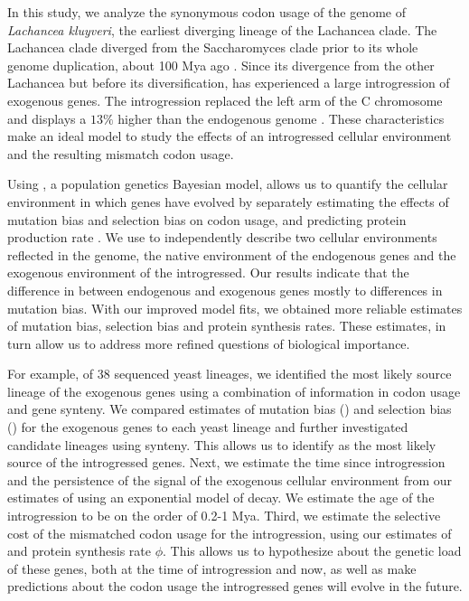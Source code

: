 In this study, we analyze the synonymous codon usage of the genome of \textit{Lachancea kluyveri}, the earliest diverging lineage of the Lachancea clade.
The Lachancea clade diverged from the Saccharomyces clade prior to its whole genome duplication, about 100 Mya ago \citep{MHM2015,Beimforde2014}.
Since its divergence from the other Lachancea but before its diversification, \kluyveri has experienced a large introgression of exogenous genes.
The introgression replaced the left arm of the C chromosome and displays a $13 \%$ higher \GC than the endogenous \kluyveri genome \citep{payen2009, friedrich2015}.
These characteristics make \kluyveri an ideal model to study the effects of an introgressed cellular environment and the resulting mismatch codon usage.

Using \ROC, a population genetics Bayesian model, allows us to quantify the cellular environment in which genes have evolved by separately estimating the effects of mutation bias and selection bias on codon usage, and predicting protein production rate \citep{gilchrist2015}.
We use \ROC to independently describe two cellular environments reflected in the \kluyveri genome, the native environment of the endogenous genes and the exogenous environment of the introgressed.
Our results indicate that the difference in \GC between endogenous and exogenous genes mostly to differences in mutation bias.
With our improved model fits, we obtained more reliable estimates of mutation bias, selection bias and protein synthesis rates.
These estimates, in turn allow us to address more refined questions of biological importance.

For example, of 38 sequenced yeast lineages, we identified the most likely source lineage of the exogenous genes using a combination of information in codon usage and gene synteny.
We compared estimates of mutation bias (\DM) and selection bias (\DE) for the exogenous genes to each yeast lineage and further investigated candidate lineages using synteny.
This allows us to identify \gossypii as the most likely source of the introgressed genes.
Next, we estimate the time since introgression and the persistence of the signal of the exogenous cellular environment from our estimates of \DM using an exponential model of decay.
We estimate the age of the introgression to be on the order of 0.2-1 Mya.
Third, we estimate the selective cost of the mismatched codon usage for the introgression, using our estimates of \DE and protein synthesis rate $\phi$.
This allows us to hypothesize about the genetic load of these genes, both at the time of introgression and now, as well as make predictions about the codon usage the introgressed genes will evolve in the future.

